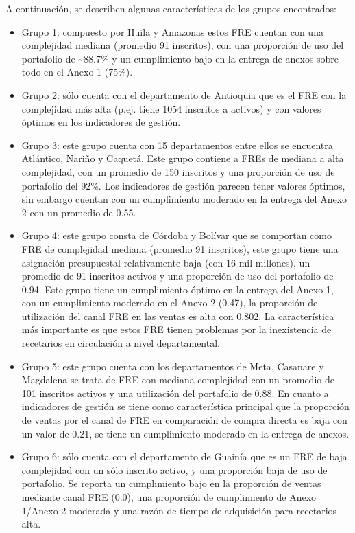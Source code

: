 \documentclass[
  oneside]{book}
\begin{document}
A continuación, se describen algunas características de los grupos encontrados:

\begin{itemize}
\item
  Grupo 1: compuesto por Huila y Amazonas estos FRE cuentan con una complejidad mediana (promedio 91 inscritos), con una proporción de uso del portafolio de \textasciitilde88.7\% y un cumplimiento bajo en la entrega de anexos sobre todo en el Anexo 1 (75\%).
\item
  Grupo 2: sólo cuenta con el departamento de Antioquia que es el FRE con la complejidad más alta (p.ej. tiene 1054 inscritos a activos) y con valores óptimos en los indicadores de gestión.
\item
  Grupo 3: este grupo cuenta con 15 departamentos entre ellos se encuentra Atlántico, Nariño y Caquetá. Este grupo contiene a FREs de mediana a alta complejidad, con un promedio de 150 inscritos y una proporción de uso de portafolio del 92\%. Los indicadores de gestión parecen tener valores óptimos, sin embargo cuentan con un cumplimiento moderado en la entrega del Anexo 2 con un promedio de 0.55.
\item
  Grupo 4: este grupo consta de Córdoba y Bolívar que se comportan como FRE de complejidad mediana (promedio 91 inscritos), este grupo tiene una asignación presupuestal relativamente baja (con 16 mil millones), un promedio de 91 inscritos activos y una proporción de uso del portafolio de 0.94. Este grupo tiene un cumplimiento óptimo en la entrega del Anexo 1, con un cumplimiento moderado en el Anexo 2 (0.47), la proporción de utilización del canal FRE en las ventas es alta con 0.802. La característica más importante es que estos FRE tienen problemas por la inexistencia de recetarios en circulación a nivel departamental.
\item
  Grupo 5: este grupo cuenta con los departamentos de Meta, Casanare y Magdalena se trata de FRE con mediana complejidad con un promedio de 101 inscritos activos y una utilización del portafolio de 0.88. En cuanto a indicadores de gestión se tiene como característica principal que la proporción de ventas por el canal de FRE en comparación de compra directa es baja con un valor de 0.21, se tiene un cumplimiento moderado en la entrega de anexos.
\item
  Grupo 6: sólo cuenta con el departamento de Guainía que es un FRE de baja complejidad con un sólo inscrito activo, y una proporción baja de uso de portafolio. Se reporta un cumplimiento bajo en la proporción de ventas mediante canal FRE (0.0), una proporción de cumplimiento de Anexo 1/Anexo 2 moderada y una razón de tiempo de adquisición para recetarios alta.

\end{itemize}
\end{document}

